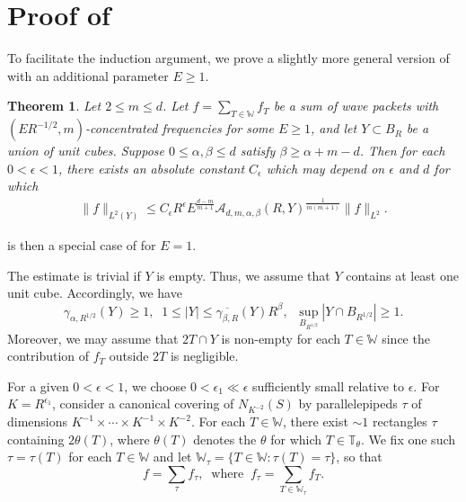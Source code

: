 \documentclass[11pt]{amsart}
\newtheorem{theorem}{Theorem}[section]
\theoremstyle{definition}
\theoremstyle{remark}
\numberwithin{equation}{section}
\newcommand{\W}{\mathbb{W}}
\newcommand{\T}{\mathbb{T}}
\newcommand{\eps}{\epsilon}
\begin{document}
\section{Proof of }\label{sec:proofMain}
To facilitate the induction argument, we prove a slightly more general version of  with an additional parameter $E\geq 1$. 
\begin{theorem}\label{thm:LpWeightedDecouplingConcentratedGeneral}
	Let $2\leq m \leq d$. Let $f = \sum_{T \in \W} f_T$ be a sum of wave packets with $(ER^{-1/2}, m)$-concentrated frequencies for some $E\geq 1$, and let $Y\subset B_R$ be a union of unit cubes.
	Suppose  $0\leq \alpha, \beta \leq d$ satisfy $\beta \geq \alpha +m - d$. Then for each $0<\eps<1$, there exists an absolute constant $C_\eps$ which may depend on $\eps$ and $d$  for which 
	\begin{align*}
	\| f \|_{L^2(Y)} \leq C_\eps R^\eps E^{\frac{d-m}{m+1}} \mathcal{A}_{d,m,\alpha,\beta}(R, Y) ^{\frac{1}{m(m+1)}} 
	\| f \|_{L^2}.
	\end{align*}
\end{theorem}
 is then a special case of  for $E=1$. 

The estimate is trivial if $Y$ is empty. Thus, we assume that $Y$ contains at least one unit cube. Accordingly, we have 
\begin{equation}\label{eqn:lowerBoundQuantities}
	 \gamma_{\alpha,R^{1/2}}(Y)  \geq 1, \;\;  1\leq |Y| \leq \overline{\gamma_{\beta,R}}(Y) R^{\beta}, \;\; \sup_{B_{R^{1/2}}} |Y\cap B_{R^{1/2}}| \geq 1.
	\end{equation}
Moreover, we may assume that $2T\cap Y$ is non-empty for each $T\in \W$ since the contribution of $f_T$ outside $2T$ is negligible. 

For a given $0<\eps<1$, we choose $0<\eps_1 \ll \eps$ sufficiently small relative to $\eps$.
For $K=R^{\eps_1}$, consider a canonical covering of $N_{K^{-2}} (S)$ by parallelepipeds $\tau$ of dimensions $K^{-1}\times \cdots \times K^{-1}\times K^{-2}$.
For each $T\in \W$, there exist $\sim 1$ rectangles $\tau$ containing $2\theta(T)$, where $\theta(T)$ denotes the $\theta$ for which $T\in \T_\theta$. We fix one such $\tau=\tau(T)$ for each $T\in \W$ and let $\W_\tau= \{ T\in \W: \tau(T) = \tau\}$, so that 
\[ f=\sum_\tau f_\tau, \;\; \text{where} \;\; f_\tau = \sum_{T \in \W_\tau} f_T. \]
\end{document}
